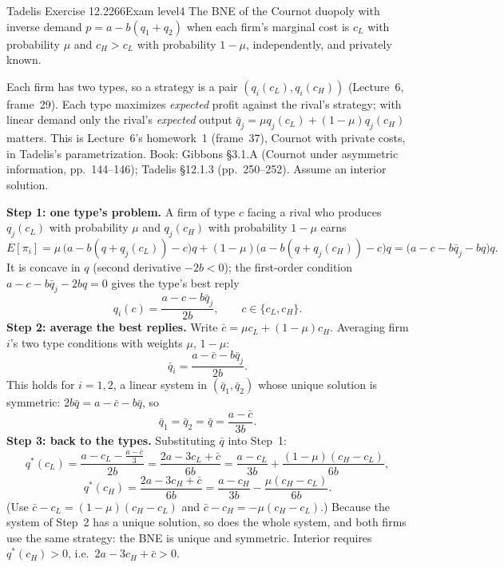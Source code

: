 \begin{exsol}{Tadelis Exercise 12.2}{266}{Exam level}{4}
\asked The BNE of the Cournot duopoly with inverse demand $p = a - b(q_1 + q_2)$ when each firm's
marginal cost is $c_L$ with probability $\mu$ and $c_H > c_L$ with probability $1 - \mu$, independently,
and privately known.

\method Each firm has two types, so a strategy is a pair $(q_i(c_L), q_i(c_H))$ (Lecture~6,
frame~29). Each type maximizes \emph{expected} profit against the rival's strategy; with linear demand
only the rival's \emph{expected} output $\bar q_j = \mu q_j(c_L) + (1-\mu) q_j(c_H)$ matters. This is
Lecture~6's homework~1 (frame~37), Cournot with private costs, in Tadelis's parametrization. Book:
Gibbons \S3.1.A (Cournot under asymmetric information, pp.~144--146); Tadelis \S12.1.3 (pp.~250--252).
Assume an interior solution.

\solution
\textbf{Step 1: one type's problem.} A firm of type $c$ facing a rival who produces $q_j(c_L)$ with
probability $\mu$ and $q_j(c_H)$ with probability $1-\mu$ earns
\[
  E[\pi_i] = \mu\,\bigl(a - b(q + q_j(c_L)) - c\bigr)q + (1 - \mu)\bigl(a - b(q + q_j(c_H)) - c\bigr)q
  = \bigl(a - c - b\bar q_j - bq\bigr)q .
\]
It is concave in $q$ (second derivative $-2b < 0$); the first-order condition $a - c - b\bar q_j - 2bq = 0$
gives the type's best reply
\[
  q_i(c) = \frac{a - c - b\bar q_j}{2b}, \qquad c \in \{c_L, c_H\}.
\]
\textbf{Step 2: average the best replies.} Write $\bar c = \mu c_L + (1-\mu)c_H$. Averaging firm $i$'s two
type conditions with weights $\mu$, $1-\mu$:
\[
  \bar q_i = \frac{a - \bar c - b\bar q_j}{2b} .
\]
This holds for $i = 1, 2$, a linear system in $(\bar q_1, \bar q_2)$ whose unique solution is symmetric:
$2b\bar q = a - \bar c - b\bar q$, so
\[
  \bar q_1 = \bar q_2 = \bar q = \frac{a - \bar c}{3b} .
\]
\textbf{Step 3: back to the types.} Substituting $\bar q$ into Step~1:
\[
  q^*(c_L) = \frac{a - c_L - \frac{a - \bar c}{3}}{2b} = \frac{2a - 3c_L + \bar c}{6b}
  = \frac{a - c_L}{3b} + \frac{(1-\mu)(c_H - c_L)}{6b},
\]
\[
  q^*(c_H) = \frac{2a - 3c_H + \bar c}{6b} = \frac{a - c_H}{3b} - \frac{\mu(c_H - c_L)}{6b}.
\]
(Use $\bar c - c_L = (1-\mu)(c_H - c_L)$ and $\bar c - c_H = -\mu(c_H - c_L)$.) Because the system of
Step~2 has a unique solution, so does the whole system, and both firms use the same strategy:
the BNE is unique and symmetric. Interior requires $q^*(c_H) > 0$, i.e.\ $2a - 3c_H + \bar c > 0$.


\end{exsol}
